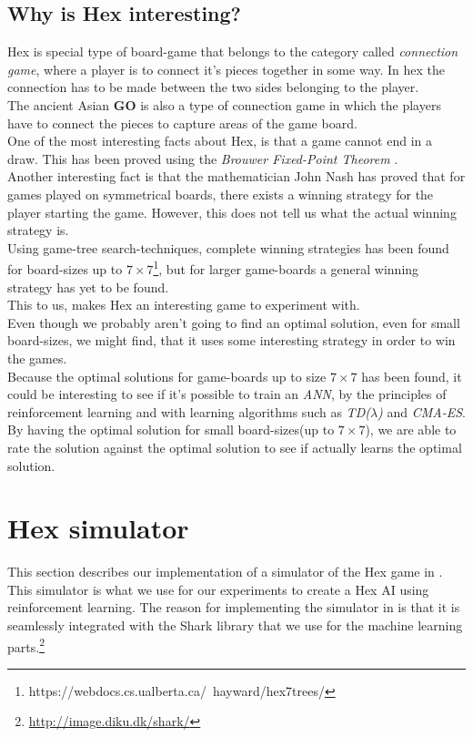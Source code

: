 \documentclass[a4paper]{article}
\begin{document}
\subsection{Why is Hex interesting?}
Hex is special type of board-game that belongs to the category called \emph{connection game}, where a player is to connect it's pieces together in some way. In hex the connection has to be made between the two sides belonging to the player. \\
The ancient Asian \textbf{GO} is also a type of connection game in which the players have to connect the pieces to capture areas of the game board. \\
One of the most interesting facts about Hex, is that a game cannot end in a draw. This has been proved using the \emph{Brouwer Fixed-Point Theorem} \cite{hexproofs1}. \\
Another interesting fact is that the mathematician John Nash has proved that for games played on symmetrical boards, there exists a winning strategy for the player starting the game. However, this does not tell us what the actual winning strategy is. \\
Using game-tree search-techniques, complete winning strategies has been found for board-sizes up to $7\times7$\footnote{https://webdocs.cs.ualberta.ca/~hayward/hex7trees/}, but for larger game-boards a general winning strategy has yet to be found.\\
This to us, makes Hex an interesting game to experiment with. \\
Even though we probably aren't going to find an optimal solution, even for small board-sizes, we might find, that it uses some interesting strategy in order to win the games. \\
Because the optimal solutions for game-boards up to size $7\times7$ has been found, it could be interesting to see if it's possible to train an \emph{ANN}, by the principles of reinforcement learning and with learning algorithms such as \emph{TD($\lambda$)} and  \emph{CMA-ES}. \\
By having the optimal solution for small board-sizes(up to $7\times7$), we are able to rate the solution against the optimal solution to see if actually learns the optimal solution. 

\section{Hex simulator}
This section describes our implementation of a simulator of the Hex game in \cpp{}. This simulator is what we use for our experiments to create a Hex AI using reinforcement learning. The reason for implementing the simulator in \cpp{} is that it is seamlessly integrated with the Shark library that we use for the machine learning parts.\footnote{\url{http://image.diku.dk/shark/}}
\end{document}
